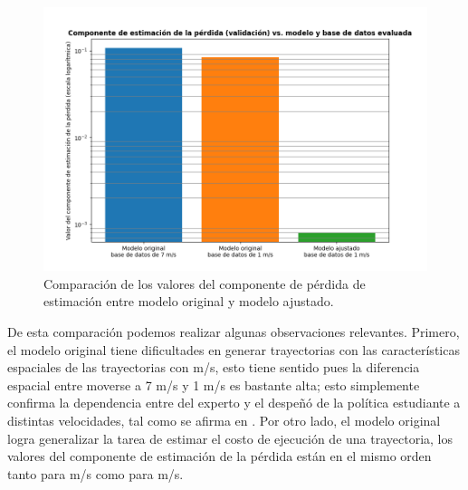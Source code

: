 \begin{figure}[H]
    \centering
    \includegraphics[scale=0.6]{partes/ImgJoao/loss-estim-bars.png}
    \caption[Comparación de los valores del componente de pérdida de estimación entre modelo original y modelo ajustado.]{Comparación de los valores del componente de pérdida de estimación entre modelo original y modelo ajustado.}
    \label{fig:loss-estim-bars}
\end{figure}

De esta comparación podemos realizar algunas observaciones relevantes. Primero, el modelo original tiene dificultades en generar trayectorias con las características espaciales de las trayectorias con  m/s, esto tiene sentido pues la diferencia espacial entre moverse a 7 m/s y 1 m/s es bastante alta; esto simplemente confirma la dependencia entre  del experto y el despeñó de la política estudiante a distintas velocidades, tal como se afirma en \cite{Loquercio2021}. Por otro lado, el modelo original logra generalizar la tarea de estimar el costo de ejecución de una trayectoria, los valores del componente de estimación de la pérdida están en el mismo orden tanto para  m/s como para  m/s. 

